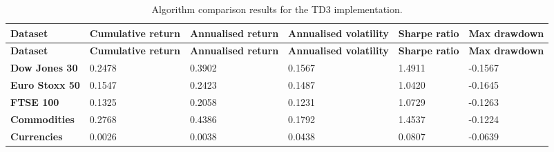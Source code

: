 \begin{longtable}{|l|p{2.1cm}|p{2.1cm}|p{2.1cm}|p{1.5cm}|p{2cm}|}
    \caption{Algorithm comparison results for the TD3 implementation.}
    \label{tab:experiment_algorithms_td3}
    \\ 
    \hline
    \textbf{Dataset} & \textbf{Cumulative return} & \textbf{Annualised return} & \textbf{Annualised volatility} & \textbf{Sharpe ratio} & \textbf{Max drawdown}  \\ \midrule
    \endfirsthead

    \hline
    \textbf{Dataset} & \textbf{Cumulative return} & \textbf{Annualised return} & \textbf{Annualised volatility} & \textbf{Sharpe ratio} & \textbf{Max drawdown}  \\ \midrule
    \endhead

    \endfoot
    \hline

    \textbf{Dow Jones 30} & 0.2478 & 0.3902 & 0.1567 & 1.4911 & -0.1567 \\ \hline
    \textbf{Euro Stoxx 50} & 0.1547 & 0.2423 & 0.1487 & 1.0420 & -0.1645 \\ \hline
    \textbf{FTSE 100} & 0.1325 & 0.2058 & 0.1231 & 1.0729 & -0.1263 \\ \hline
    \textbf{Commodities} & 0.2768 & 0.4386 & 0.1792 & 1.4537 & -0.1224 \\ \hline
    \textbf{Currencies} & 0.0026 & 0.0038 & 0.0438 & 0.0807 & -0.0639 \\ \hline
\end{longtable}